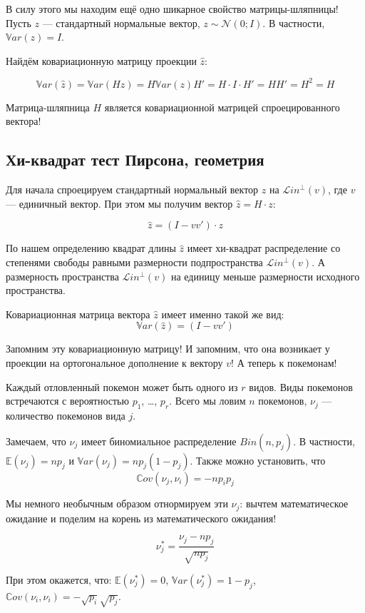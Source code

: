 \documentclass[11pt,russian,]{article}
\newcommand{\cN}{\mathcal{N}}
\newcommand{\E}{\mathbb{E}}
\newcommand{\1}{\mathbbm{1}}
\newcommand{\Lin}{\mathcal{L}in}
\newcommand{\Linp}{\Lin^{\perp}}
\newcommand{\Var}{\mathbb{V}ar}
\newcommand{\Cov}{\mathbb{C}ov}
\begin{document}
В силу этого мы находим ещё одно шикарное свойство матрицы-шляпницы!
Пусть \(z\) --- стандартный нормальные вектор, \(z \sim \cN(0; I)\). В
частности, \(\Var(z) = I\).

Найдём ковариационную матрицу проекции \(\hat z\):

\[
\Var(\hat z) = \Var(Hz)=H\Var(z)H'=H\cdot I\cdot H'=HH'=H^2=H
\]

Матрица-шляпница \(H\) является ковариационной матрицей спроецированного
вектора!

\subsection{Хи-квадрат тест Пирсона, геометрия}\label{----}

Для начала спроецируем стандартный нормальный вектор \(z\) на
\(\Linp(v)\), где \(v\) --- единичный вектор. При этом мы получим вектор
\(\hat z = H \cdot z\):

\[
\hat z = (I - vv')\cdot z
\]

По нашем определению квадрат длины \(\hat z\) имеет хи-квадрат
распределение со степенями свободы равными размерности подпространства
\(\Linp(v)\). А размерность пространства \(\Linp(v)\) на единицу меньше
размерности исходного пространства.

Ковариационная матрица вектора \(\hat z\) имеет именно такой же вид: \[
\Var(\hat z) = (I - vv')
\]

Запомним эту ковариационную матрицу! И запомним, что она возникает у
проекции на ортогональное дополнение к вектору \(v\)! А теперь к
покемонам!

Каждый отловленный покемон может быть одного из \(r\) видов. Виды
покемонов встречаются с вероятностью \(p_1\), \ldots, \(p_{r}\). Всего
мы ловим \(n\) покемонов, \(\nu_j\) --- количество покемонов вида \(j\).

Замечаем, что \(\nu_j\) имеет биномиальное распределение
\(Bin(n, p_j)\). В частности, \(\E(\nu_j) = np_j\) и
\(\Var(\nu_j)=n p_j (1- p_j)\). Также можно установить, что \[
\Cov(\nu_j, \nu_i) = -np_ip_j
\]

Мы немного необычным образом отнормируем эти \(\nu_j\): вычтем
математическое ожидание и поделим на корень из математического ожидания!

\[
\nu_j^* = \frac{\nu_j - np_j}{\sqrt{np_j}}
\]

При этом окажется, что: \(\E(\nu_j^*) = 0\),
\(\Var(\nu_j^*) = 1 - p_j\),
\(\Cov(\nu_i, \nu_i) = - \sqrt{p_i}\sqrt{p_j}\).
\end{document}
